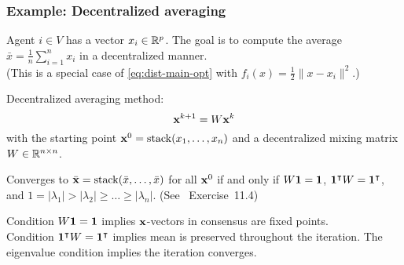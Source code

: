 \documentclass[10pt,mathserif]{beamer}
\begin{document}
\begin{frame}
\frametitle{Example: Decentralized averaging}
Agent $i\in V$ has a vector $x_i\in\mathbb{R}^p$. The goal is to compute the average $\bar{x} = \frac{1}{n}\sum_{i=1}^{n} x_i$ in a decentralized manner.\\
(This is a special case of \eqref{eq:dist-main-opt} with $f_i(x)=\frac{1}{2}\|x - x_i\|^2$.)
\vspace{0.2in}

Decentralized averaging method:
\[
  {\mathbf{x}}^{k+1}= W {\mathbf{x}}^k
\]
with the starting point ${\mathbf{x}}^0=\mathrm{stack}(x_1,\dots,x_n)$ and a decentralized mixing matrix $W\in \mathbb{R}^{n\times n}$.
\medskip

Converges to $\bar{{\mathbf{x}}}=\mathrm{stack}(\bar{x},\dots,\bar{x})$ for all ${\mathbf{x}}^0$ if and only if $W{\mathbf{1}} = {\mathbf{1}}$, ${\mathbf{1}}^\intercal W = {\mathbf{1}}^\intercal$, and $1=|\lambda_1| > |\lambda_2| \ge \dots \ge |\lambda_n|$. (See \ Exercise~11.4)
\medskip

Condition $W{\mathbf{1}} = {\mathbf{1}}$ implies ${\mathbf{x}}$-vectors in consensus are fixed points.\\
Condition ${\mathbf{1}}^\intercal W = {\mathbf{1}}^\intercal$ implies mean is preserved throughout the iteration.
The eigenvalue condition implies the iteration converges.
\end{frame}
\end{document}
